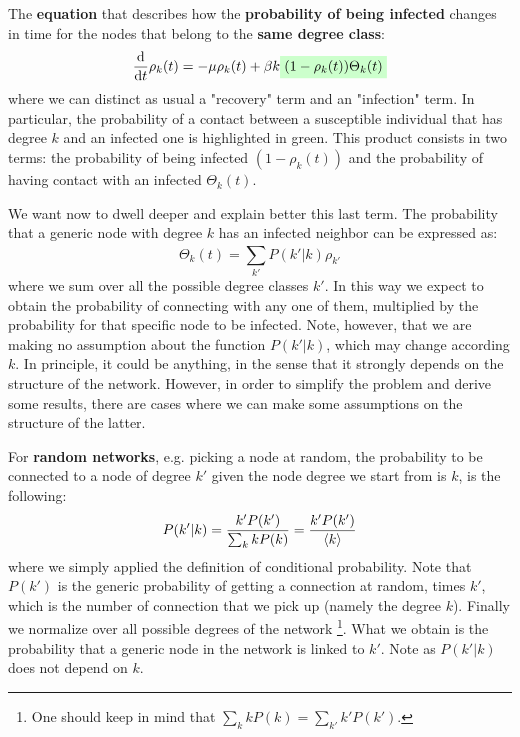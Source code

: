 \documentclass[../main/main.tex]{subfiles}
\begin{document}
The \textbf{equation} that describes how the \textbf{probability of being infected} changes in time for the nodes that belong to the \textbf{same degree class}:
\begin{equation}
  \dv{}{t}  \rho _k (t) = - \mu \rho _k (t) + \beta k \mathcolorbox{green!20}{(1- \rho _k (t)) \Theta _k (t)}
\end{equation}
where we can distinct as usual a "recovery" term and an "infection" term. In particular, the probability of a contact between a susceptible individual that has degree \( k \) and an infected one is highlighted in green.
This product consists in two terms: the probability of being infected \( (1- \rho _k (t)) \) and the probability of having contact with an infected \( \Theta _k (t) \).

We want now to dwell deeper and explain better this last term. The probability that a generic node with degree \( k \) has an infected neighbor can be expressed as:
\begin{equation}
\label{eqn:theta_k(t)}
  \Theta _k(t) = \sum_{k'}^{} P(k'|k)\rho _{k'}
\end{equation}
where we sum over all the possible degree classes $k'$. In this way we expect to obtain the probability of connecting with any one of them, multiplied by the probability for that specific node to be infected.
Note, however, that we are making no assumption about the function \(  P(k'|k) \), which may change according \( k \). In principle, it could be anything, in the sense that it strongly depends on the structure of the network. However, in order to simplify the problem and derive some results, there are cases where we can make some assumptions on the structure of the latter.

For \textbf{random networks}, e.g. picking a node at random, the probability to be connected to a node of degree $k'$ given the node degree we start from is $k$, is the following:
\begin{equation}
  P(k'|k) = \frac{k'P(k')}{\sum_{k} k P(k)  } = \frac{k'P(k')}{\expval{k}  }
\end{equation}
where we simply applied the definition of conditional probability. Note that \( P(k') \) is the generic probability of getting a connection at random, times \( k' \), which is the number of connection that we pick up (namely the degree $k$). Finally we normalize over all possible degrees of the network \footnote{One should keep in mind that $\sum_{k} kP(k) = \sum_{k'} k'P(k') $.}. What we obtain is the probability that a generic node in the network is linked to \( k' \).  Note as \( P(k'|k) \) does not depend on \( k \).
\end{document}
